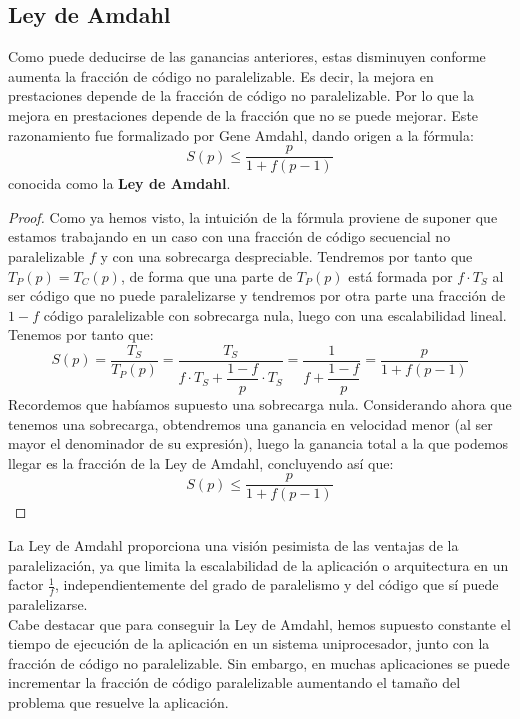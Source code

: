 \subsection{Ley de Amdahl}
Como puede deducirse de las ganancias anteriores, estas disminuyen conforme aumenta la fracción de código no paralelizable. Es decir, la mejora en prestaciones depende de la fracción de código no paralelizable. Por lo que la mejora en prestaciones depende de la fracción que no se puede mejorar. Este razonamiento fue formalizado por Gene Amdahl, dando origen a la fórmula:
\begin{equation}
    S(p) \leq \dfrac{p}{1+f(p-1)}
\end{equation}
conocida como la \textbf{Ley de Amdahl}. 
\begin{proof}
    Como ya hemos visto, la intuición de la fórmula proviene de suponer que estamos trabajando en un caso con una fracción de código secuencial no paralelizable $f$ y con una sobrecarga despreciable. Tendremos por tanto que $T_P(p) = T_C(p)$, de forma que una parte de $T_P(p)$ está formada por $f\cdot T_S$ al ser código que no puede paralelizarse y tendremos por otra parte una fracción de $1-f$ código paralelizable con sobrecarga nula, luego con una escalabilidad lineal. Tenemos por tanto que:
    \begin{equation*}
        S(p) = \dfrac{T_S}{T_P(p)} = \dfrac{T_S}{f\cdot T_S+\dfrac{1-f}{p}\cdot T_S} = \dfrac{1}{f+\dfrac{1-f}{p}} = \dfrac{p}{1+f(p-1)}
    \end{equation*}
    Recordemos que habíamos supuesto una sobrecarga nula. Considerando ahora que tenemos una sobrecarga, obtendremos una ganancia en velocidad menor (al ser mayor el denominador de su expresión), luego la ganancia total a la que podemos llegar es la fracción de la Ley de Amdahl, concluyendo así que:
    \begin{equation*}
        S(p) \leq \dfrac{p}{1+f(p-1)}
    \end{equation*}
\end{proof}

La Ley de Amdahl proporciona una visión pesimista de las ventajas de la paralelización, ya que limita la escalabilidad de la aplicación o arquitectura en un factor $\frac{1}{f}$, independientemente del grado de paralelismo y del código que sí puede paralelizarse.\\

Cabe destacar que para conseguir la Ley de Amdahl, hemos supuesto constante el tiempo de ejecución de la aplicación en un sistema uniprocesador, junto con la fracción de código no paralelizable. Sin embargo, en muchas aplicaciones se puede incrementar la fracción de código paralelizable aumentando el tamaño del problema que resuelve la aplicación.

